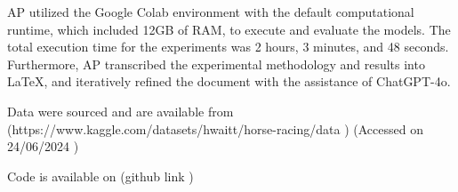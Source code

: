 \documentclass{article}
\begin{document}
AP utilized the Google Colab environment with the default computational runtime, which included 12GB of RAM, to execute and evaluate the models. The total execution time for the experiments was 2 hours, 3 minutes, and 48 seconds. Furthermore, AP transcribed the experimental methodology and results into LaTeX, and iteratively refined the document with the assistance of ChatGPT-4o. 

Data were sourced and are available from (https://www.kaggle.com/datasets/hwaitt/horse-racing/data ) (Accessed on 24/06/2024 ) 

Code is available on (github link ) 
\end{document}
